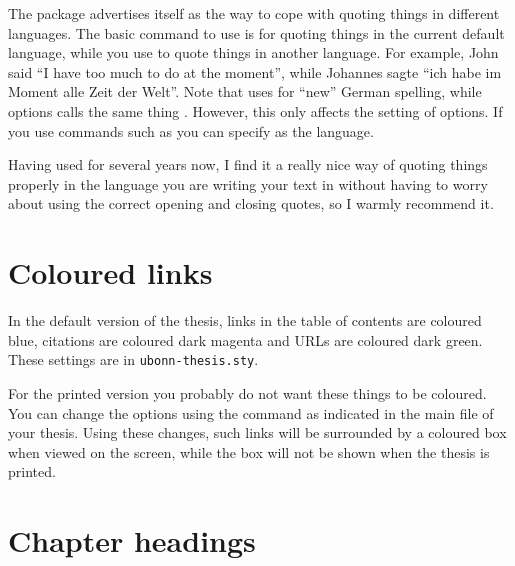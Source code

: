 The  package advertises itself as the way to cope
with quoting things in different languages. The basic
command to use is 
for quoting things in the current default language, while you
use  to quote things in another language. For
example, John said \enquote{I have too much to do at the moment},
while \foreignlanguage{ngerman}{Johannes sagte}
\foreignquote{ngerman}{ich habe im Moment alle Zeit der Welt}.
Note that  uses  for \enquote{new} German
spelling, while  options calls the same thing
. However, this only affects the setting of options. If
you use commands such as  you can specify
 as the language.

Having used  for several years now, I find it a
really nice way of quoting things properly in the language you are
writing your text in without having to worry about using the correct
opening and closing quotes, so I warmly recommend it.

\section{Coloured links}%
\label{sec:layout:link}

In the default version of the thesis, links in the table of contents
are coloured blue, citations are coloured dark magenta and URLs are
coloured dark green. These settings are in \texttt{ubonn-thesis.sty}.

For the printed version you probably do not want these things to be
coloured. You can change the  options using the
 command as indicated in the main file of your
thesis. Using these changes, such links will be surrounded by a
coloured box when viewed on the screen, while the box will not be shown when the thesis
is printed.


\section{Chapter headings}%
\label{sec:layout:chapter}

